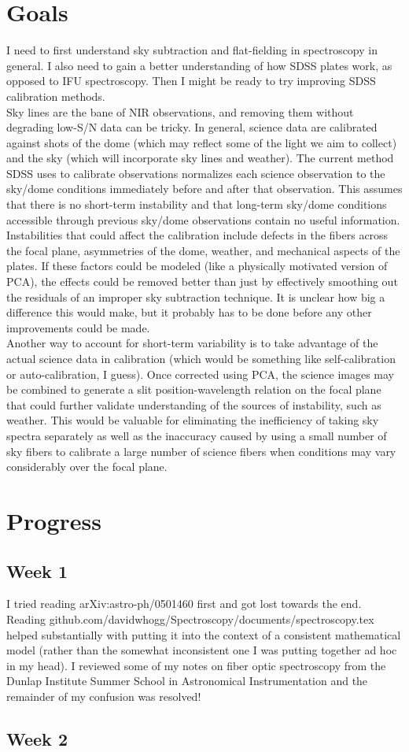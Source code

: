 \documentclass[12pt]{article}
\begin{document}
\section*{Goals}
I need to first understand sky subtraction and flat-fielding in spectroscopy in general.  I also need to gain a better understanding of how SDSS plates work, as opposed to IFU spectroscopy.  Then I might be ready to try improving SDSS calibration methods.\\
\indent Sky lines are the bane of NIR observations, and removing them without degrading low-S/N data can be tricky.  In general, science data are calibrated against shots of the dome (which may reflect some of the light we aim to collect) and the sky (which will incorporate sky lines and weather).  The current method SDSS uses to calibrate observations normalizes each science observation to the sky/dome conditions immediately before and after that observation.  This assumes that there is no short-term instability and that long-term sky/dome conditions accessible through previous sky/dome observations contain no useful information.\\
\indent Instabilities that could affect the calibration include defects in the fibers across the focal plane, asymmetries of the dome, weather, and mechanical aspects of the plates.  If these factors could be modeled (like a physically motivated version of PCA), the effects could be removed better than just by effectively smoothing out the residuals of an improper sky subtraction technique.  It is unclear how big a difference this would make, but it probably has to be done before any other improvements could be made.\\
\indent Another way to account for short-term variability is to take advantage of the actual science data in calibration (which would be something like self-calibration or auto-calibration, I guess).  Once corrected using PCA, the science images may be combined to generate a slit position-wavelength relation on the focal plane that could further validate understanding of the sources of instability, such as weather.  This would be valuable for eliminating the inefficiency of taking sky spectra separately as well as the inaccuracy caused by using a small number of sky fibers to calibrate a large number of science fibers when conditions may vary considerably over the focal plane.
\section*{Progress}
\subsection*{Week 1}
I tried reading arXiv:astro-ph/0501460 first and got lost towards the end.  Reading github.com/davidwhogg/Spectroscopy/documents/spectroscopy.tex helped substantially with putting it into the context of a consistent mathematical model (rather than the somewhat inconsistent one I was putting together ad hoc in my head).  I reviewed some of my notes on fiber optic spectroscopy from the Dunlap Institute Summer School in Astronomical Instrumentation and the remainder of my confusion was resolved!
\subsection*{Week 2}
\end{document}
